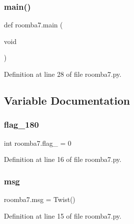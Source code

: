 \subsubsection{\texorpdfstring{main()}{main()}}
{\footnotesize\ttfamily def roomba7.\+main (\begin{DoxyParamCaption}\item[{void}]{ }\end{DoxyParamCaption})}



Definition at line 28 of file roomba7.\+py.



\subsection{Variable Documentation}
\mbox{\label{namespaceroomba7_ab53f4dccb94d2309d6b647417b978941}} 
\subsubsection{\texorpdfstring{flag\_180}{flag\_180}}
{\footnotesize\ttfamily int roomba7.\+flag\+\_ = 0}



Definition at line 16 of file roomba7.\+py.

\mbox{\label{namespaceroomba7_afc2fb6a41aa7cf1f7bb1ea383afb3ce8}} 
\subsubsection{\texorpdfstring{msg}{msg}}
{\footnotesize\ttfamily roomba7.\+msg = Twist()}



Definition at line 15 of file roomba7.\+py.

